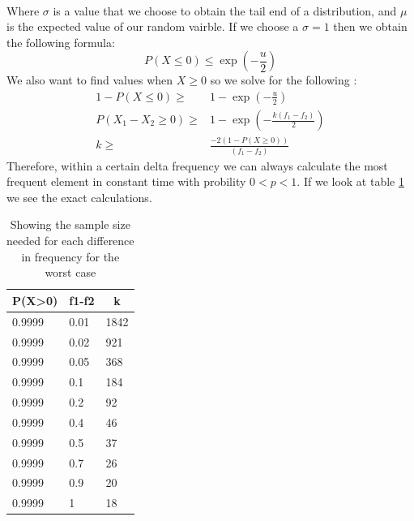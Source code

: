 \documentclass[]{article}
\begin{document}
\paragraph{}
Where $\sigma$ is a value that we choose to obtain the tail end of a distribution, and $\mu$ is the expected value of our random vairble.
If we choose a $\sigma = 1$ then we obtain the following formula:
$$P(X\le 0) \le \exp(-\frac{u}{2})$$
We also want to find values when $X\ge 0$ so we solve for the following :
\begin{align*}
  1 - P(X\le 0) \ge& 1 - \exp(-\frac{u}{2})\\
  P(X_1-X_2 \ge 0) \ge& 1 - \exp(-\frac{k(f_1-f_2)}{2})\\
  k \ge& \frac{-2(1-P(X\ge 0))}{(f_1-f_2)}
\end{align*}
Therefore, within a certain delta frequency we can always calculate the most frequent element in constant time with probility $0<p<1$. If we look at table \ref{tab-freq} we see the exact calculations.

\begin{table}[H]
\centering
\begin{tabular}{|l|l|l|}
\hline
\multicolumn{1}{|c|}{\textbf{P(X\textgreater{}0)}} & \multicolumn{1}{c|}{\textbf{f1-f2}} & \multicolumn{1}{c|}{\textbf{k}} \\ \hline
0.9999                                             & 0.01                                & 1842                            \\ \hline
0.9999                                             & 0.02                                & 921                             \\ \hline
0.9999                                             & 0.05                                & 368                             \\ \hline
0.9999                                             & 0.1                                 & 184                             \\ \hline
0.9999                                             & 0.2                                 & 92                              \\ \hline
0.9999                                             & 0.4                                 & 46                              \\ \hline
0.9999                                             & 0.5                                 & 37                              \\ \hline
0.9999                                             & 0.7                                 & 26                              \\ \hline
0.9999                                             & 0.9                                 & 20                              \\ \hline
0.9999                                             & 1                                   & 18                              \\ \hline
\end{tabular}
\caption{Showing the sample size needed for each difference in frequency for the worst case}
\label{tab-freq}
\end{table}
\end{document}

